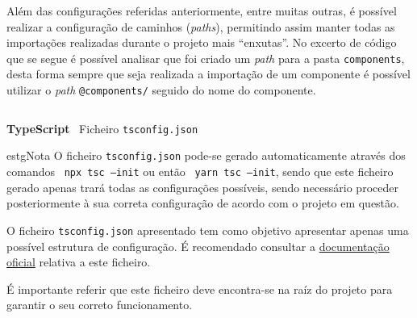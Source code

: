 Além das configurações referidas anteriormente, entre muitas outras, é possível realizar a configuração de caminhos (\textit{paths}), permitindo assim manter todas as importações realizadas durante o projeto mais ``enxutas''. No excerto de código que se segue é possível analisar que foi criado um \textit{path} para a pasta \texttt{components}, desta forma sempre que seja realizada a importação de um componente é possível utilizar o \textit{path} \texttt{@components/} seguido do nome do componente.

\begin{longlisting}
	\inputminted{json}{code/typescript/tsconfig.json}
	\caption{\textbf{TypeScript} \textemdash~Ficheiro \texttt{tsconfig.json}}
\end{longlisting}

\begin{mybox}{estg}{Nota}
	O ficheiro \texttt{tsconfig.json} pode-se gerado automaticamente através dos comandos ~\texttt{npx tsc --init} ou então ~\texttt{yarn tsc --init}, sendo que este ficheiro gerado apenas trará todas as configurações possíveis, sendo necessário proceder posteriormente à sua correta configuração de acordo com o projeto em questão.

	\vspace{0.35cm}

	O ficheiro \texttt{tsconfig.json} apresentado tem como objetivo apresentar apenas uma possível estrutura de configuração. É recomendado consultar a \href{https://www.typescriptlang.org/tsconfig}{documentação oficial} relativa a este ficheiro.

	\vspace{0.15cm}

	É importante referir que este ficheiro deve encontra-se na raíz do projeto para garantir o seu correto funcionamento.
\end{mybox}